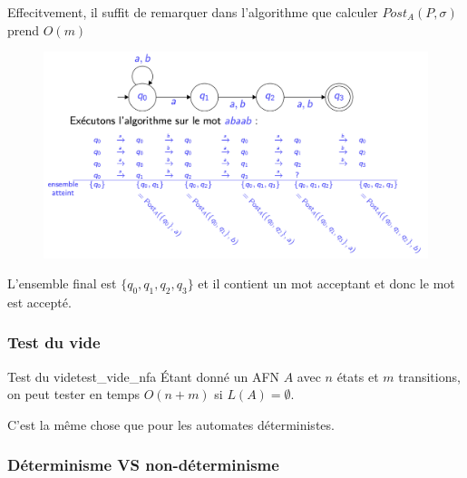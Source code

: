 \begin{remark}
    Effecitvement, il suffit de remarquer dans l'algorithme que calculer $Post_A(P,\sigma)$ prend $O(m)$
\end{remark}
\begin{figure}[H]
    \centering
    \includegraphics[scale = 0.4]{pictures/appartenance_langage_nfa.png}
\end{figure}
L'ensemble final est $\{q_0, q_1, q_2, q_3\}$ et il contient un mot acceptant et donc le mot est accepté. \\





\subsubsection{Test du vide}
\label{subsub:test_du_vide_nfa}
\begin{theorem}{Test du vide}{test_vide_nfa}
    Étant donné un AFN $A$ avec $n$ états et $m$ transitions, on peut tester en temps $O(n+m)$ si $L(A) = \emptyset$.
\end{theorem}
C'est la même chose que pour les automates déterministes.


\subsubsection{Déterminisme VS non-déterminisme}
\label{subsub:determinisme_vs_non_determinisme}

